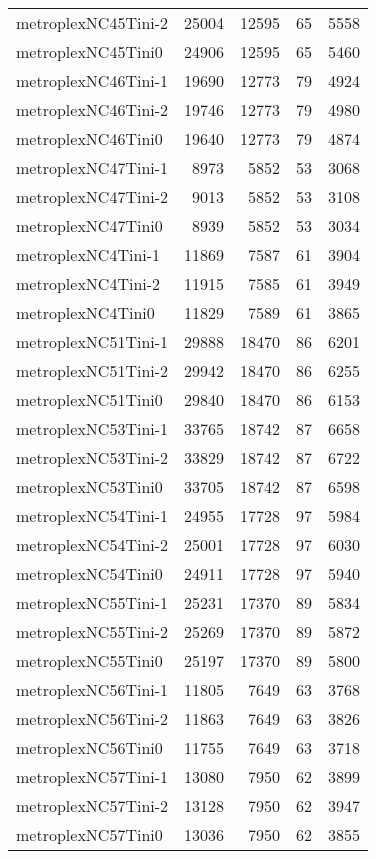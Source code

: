 \begin{longtable}{lrrrr}
metroplexNC45Tini-2 & 25004 & 12595 & 65 & 5558 \\
metroplexNC45Tini0 & 24906 & 12595 & 65 & 5460 \\
metroplexNC46Tini-1 & 19690 & 12773 & 79 & 4924 \\
metroplexNC46Tini-2 & 19746 & 12773 & 79 & 4980 \\
metroplexNC46Tini0 & 19640 & 12773 & 79 & 4874 \\
metroplexNC47Tini-1 & 8973 & 5852 & 53 & 3068 \\
metroplexNC47Tini-2 & 9013 & 5852 & 53 & 3108 \\
metroplexNC47Tini0 & 8939 & 5852 & 53 & 3034 \\
metroplexNC4Tini-1 & 11869 & 7587 & 61 & 3904 \\
metroplexNC4Tini-2 & 11915 & 7585 & 61 & 3949 \\
metroplexNC4Tini0 & 11829 & 7589 & 61 & 3865 \\
metroplexNC51Tini-1 & 29888 & 18470 & 86 & 6201 \\
metroplexNC51Tini-2 & 29942 & 18470 & 86 & 6255 \\
metroplexNC51Tini0 & 29840 & 18470 & 86 & 6153 \\
metroplexNC53Tini-1 & 33765 & 18742 & 87 & 6658 \\
metroplexNC53Tini-2 & 33829 & 18742 & 87 & 6722 \\
metroplexNC53Tini0 & 33705 & 18742 & 87 & 6598 \\
metroplexNC54Tini-1 & 24955 & 17728 & 97 & 5984 \\
metroplexNC54Tini-2 & 25001 & 17728 & 97 & 6030 \\
metroplexNC54Tini0 & 24911 & 17728 & 97 & 5940 \\
metroplexNC55Tini-1 & 25231 & 17370 & 89 & 5834 \\
metroplexNC55Tini-2 & 25269 & 17370 & 89 & 5872 \\
metroplexNC55Tini0 & 25197 & 17370 & 89 & 5800 \\
metroplexNC56Tini-1 & 11805 & 7649 & 63 & 3768 \\
metroplexNC56Tini-2 & 11863 & 7649 & 63 & 3826 \\
metroplexNC56Tini0 & 11755 & 7649 & 63 & 3718 \\
metroplexNC57Tini-1 & 13080 & 7950 & 62 & 3899 \\
metroplexNC57Tini-2 & 13128 & 7950 & 62 & 3947 \\
metroplexNC57Tini0 & 13036 & 7950 & 62 & 3855 \\

\end{longtable}
